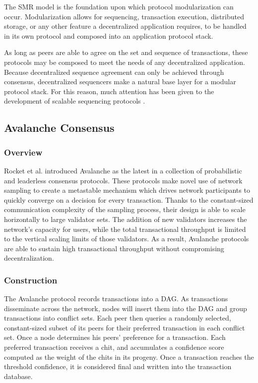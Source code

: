 \documentclass[12pt]{article}
\begin{document}
  The SMR model is the foundation upon which protocol modularization can occur.
  Modularization allows for sequencing, transaction execution, distributed
  storage, or any other feature a decentralized application requires, to be
  handled in its own protocol and composed into an application protocol stack. 
  
  As long as peers are able to agree on the set and sequence of transactions,
  these protocols may be composed to meet the needs of any decentralized
  application. Because decentralized sequence agreement can only be achieved
  through consensus, decentralized sequencers make a natural base layer for a
  modular protocol stack. For this reason, much attention has been given to the
  development of scalable sequencing protocols \cite{astriaIntro,
  espressoIntro}.

\subsection{Avalanche Consensus}
\subsubsection{Overview}
  Rocket et al. introduced Avalanche as the latest in a collection of
  probabilistic and leaderless consensus protocols\cite{rocket}. These
  protocols make novel use of network sampling to create a metastable mechanism
  which drives network participants to quickly converge on a decision for every
  transaction. Thanks to the constant-sized communication complexity of the
  sampling process, their design is able to scale horizontally to large
  validator sets. The addition of new validators increases the network's
  capacity for users, while the total transactional throughput is limited to
  the vertical scaling limits of those validators. As a result, Avalanche
  protocols are able to sustain high transactional throughput without
  compromising decentralization.

\subsubsection{Construction}
  The Avalanche protocol records transactions into a DAG. As transactions
  disseminate across the network, nodes will insert them into the DAG and group
  transactions into conflict sets. Each peer then queries a randomly selected,
  constant-sized subset of its peers for their preferred transaction in each
  conflict set. Once a node determines his peers' preference for a transaction.
  Each preferred transaction receives a chit, and accumulates a confidence
  score computed as the weight of the chits in its progeny. Once a transaction
  reaches the threshold confidence, it is considered final and written into the
  transaction database.
\end{document}

